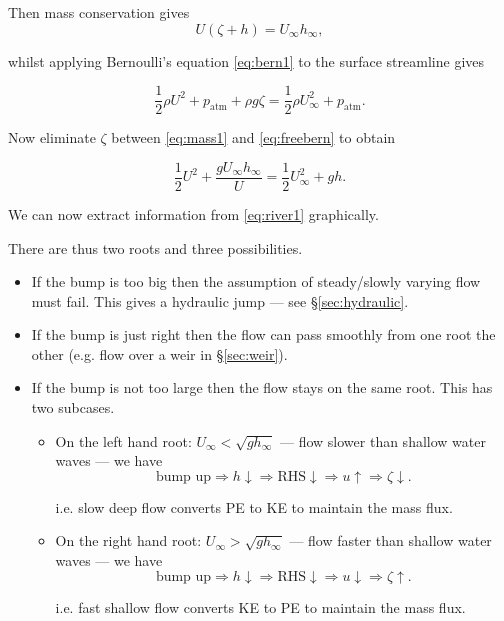 \documentclass{notes}
\begin{document}
Then mass conservation gives
\begin{equation}\label{eq:mass1}
U (\zeta + h) = U_\infty h_\infty,
\end{equation}

whilst applying Bernoulli's equation \eqref{eq:bern1} to the surface
streamline gives

\begin{equation}\label{eq:freebern}
\frac{1}{2} \rho U^2 + p_{\text{atm}} + \rho g \zeta
= \frac{1}{2} \rho U_\infty^2 + p_{\text{atm}}.
\end{equation}

Now eliminate $\zeta$ between \eqref{eq:mass1} and \eqref{eq:freebern}
to obtain

\begin{equation}\label{eq:river1}
\frac{1}{2} U^2 + \frac{g U_\infty h_\infty}{U}
= \frac{1}{2} U_\infty^2 + g h.
\end{equation}

We can now extract information from \eqref{eq:river1} graphically.

\vspace{2in}

There are thus two roots and three possibilities.

\begin{itemize}
\item If the bump is too big then the assumption of steady/slowly
  varying flow must fail.  This gives a hydraulic jump --- see
  \S\ref{sec:hydraulic}.
\item If the bump is just right then the flow can pass smoothly from
  one root the other (e.g. flow over a weir in \S\ref{sec:weir}).
\item If the bump is not too large then the flow stays on the same
  root.  This has two subcases.
  \begin{itemize}
    \item On the left hand root: $U_\infty < \sqrt{g h_\infty}$ ---
      flow slower than shallow water waves --- we have
\[
\text{bump up} \Rightarrow h \downarrow \Rightarrow \text{RHS} \downarrow
\Rightarrow u \uparrow \Rightarrow \zeta \downarrow.
\]

i.e. slow deep flow converts PE to KE to maintain the mass flux. 

    \item On the right hand root: $U_\infty > \sqrt{g h_\infty}$ ---
      flow faster than shallow water waves --- we have
\[
\text{bump up} \Rightarrow h \downarrow \Rightarrow \text{RHS} \downarrow
\Rightarrow u \downarrow \Rightarrow \zeta \uparrow.
\]

i.e. fast shallow flow converts KE to PE to maintain the mass flux.

  \end{itemize}
\end{itemize}
\end{document}
